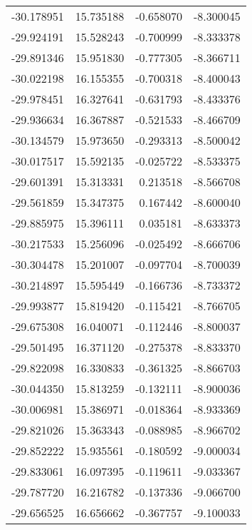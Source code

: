 \begin{tabular}{rrrr}
      -30.178951 &        15.735188 &   -0.658070 &  -8.300045 \\
      -29.924191 &        15.528243 &   -0.700999 &  -8.333378 \\
      -29.891346 &        15.951830 &   -0.777305 &  -8.366711 \\
      -30.022198 &        16.155355 &   -0.700318 &  -8.400043 \\
      -29.978451 &        16.327641 &   -0.631793 &  -8.433376 \\
      -29.936634 &        16.367887 &   -0.521533 &  -8.466709 \\
      -30.134579 &        15.973650 &   -0.293313 &  -8.500042 \\
      -30.017517 &        15.592135 &   -0.025722 &  -8.533375 \\
      -29.601391 &        15.313331 &    0.213518 &  -8.566708 \\
      -29.561859 &        15.347375 &    0.167442 &  -8.600040 \\
      -29.885975 &        15.396111 &    0.035181 &  -8.633373 \\
      -30.217533 &        15.256096 &   -0.025492 &  -8.666706 \\
      -30.304478 &        15.201007 &   -0.097704 &  -8.700039 \\
      -30.214897 &        15.595449 &   -0.166736 &  -8.733372 \\
      -29.993877 &        15.819420 &   -0.115421 &  -8.766705 \\
      -29.675308 &        16.040071 &   -0.112446 &  -8.800037 \\
      -29.501495 &        16.371120 &   -0.275378 &  -8.833370 \\
      -29.822098 &        16.330833 &   -0.361325 &  -8.866703 \\
      -30.044350 &        15.813259 &   -0.132111 &  -8.900036 \\
      -30.006981 &        15.386971 &   -0.018364 &  -8.933369 \\
      -29.821026 &        15.363343 &   -0.088985 &  -8.966702 \\
      -29.852222 &        15.935561 &   -0.180592 &  -9.000034 \\
      -29.833061 &        16.097395 &   -0.119611 &  -9.033367 \\
      -29.787720 &        16.216782 &   -0.137336 &  -9.066700 \\
      -29.656525 &        16.656662 &   -0.367757 &  -9.100033 \\

\end{tabular}
